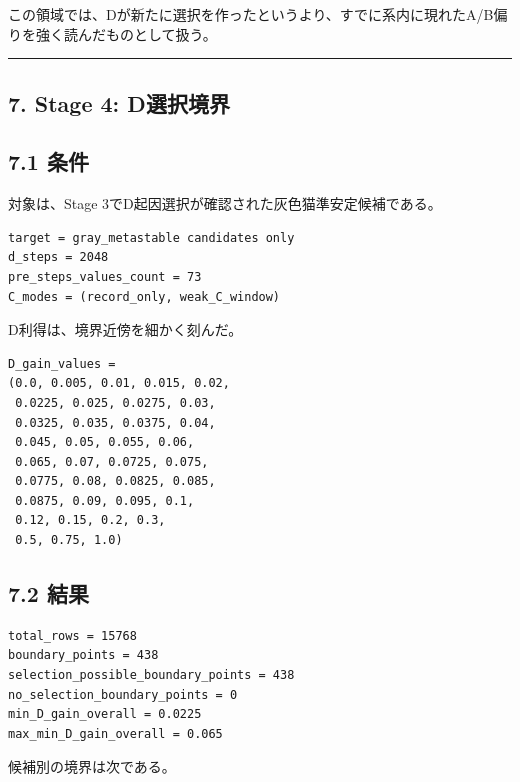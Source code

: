 \documentclass{article}
\begin{document}
この領域では、Dが新たに選択を作ったというより、すでに系内に現れたA/B偏りを強く読んだものとして扱う。

\begin{center}\rule{0.5\linewidth}{0.5pt}\end{center}

\subsection{7. Stage 4:
D選択境界}\label{stage-4-dux9078ux629eux5883ux754c}

\subsection{7.1 条件}\label{ux6761ux4ef6-3}

対象は、Stage 3でD起因選択が確認された灰色猫準安定候補である。

\begin{verbatim}
target = gray_metastable candidates only
d_steps = 2048
pre_steps_values_count = 73
C_modes = (record_only, weak_C_window)
\end{verbatim}

D利得は、境界近傍を細かく刻んだ。

\begin{verbatim}
D_gain_values =
(0.0, 0.005, 0.01, 0.015, 0.02,
 0.0225, 0.025, 0.0275, 0.03,
 0.0325, 0.035, 0.0375, 0.04,
 0.045, 0.05, 0.055, 0.06,
 0.065, 0.07, 0.0725, 0.075,
 0.0775, 0.08, 0.0825, 0.085,
 0.0875, 0.09, 0.095, 0.1,
 0.12, 0.15, 0.2, 0.3,
 0.5, 0.75, 1.0)
\end{verbatim}

\subsection{7.2 結果}\label{ux7d50ux679c-2}

\begin{verbatim}
total_rows = 15768
boundary_points = 438
selection_possible_boundary_points = 438
no_selection_boundary_points = 0
min_D_gain_overall = 0.0225
max_min_D_gain_overall = 0.065
\end{verbatim}

候補別の境界は次である。
\end{document}

